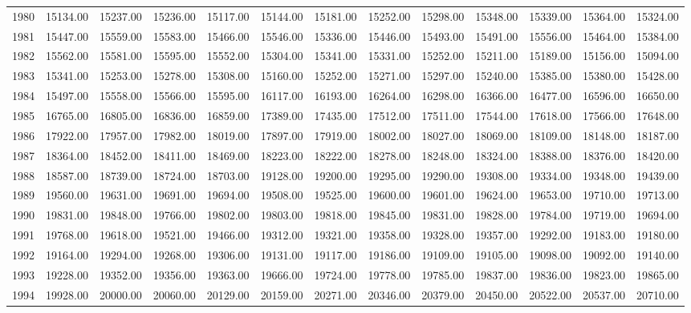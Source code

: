 \begin{longtable}{rrrrrrrrrrrrr}
  1980 & 15134.00 & 15237.00 & 15236.00 & 15117.00 & 15144.00 & 15181.00 & 15252.00 & 15298.00 & 15348.00 & 15339.00 & 15364.00 & 15324.00 \\ 
  1981 & 15447.00 & 15559.00 & 15583.00 & 15466.00 & 15546.00 & 15336.00 & 15446.00 & 15493.00 & 15491.00 & 15556.00 & 15464.00 & 15384.00 \\ 
  1982 & 15562.00 & 15581.00 & 15595.00 & 15552.00 & 15304.00 & 15341.00 & 15331.00 & 15252.00 & 15211.00 & 15189.00 & 15156.00 & 15094.00 \\ 
  1983 & 15341.00 & 15253.00 & 15278.00 & 15308.00 & 15160.00 & 15252.00 & 15271.00 & 15297.00 & 15240.00 & 15385.00 & 15380.00 & 15428.00 \\ 
  1984 & 15497.00 & 15558.00 & 15566.00 & 15595.00 & 16117.00 & 16193.00 & 16264.00 & 16298.00 & 16366.00 & 16477.00 & 16596.00 & 16650.00 \\ 
  1985 & 16765.00 & 16805.00 & 16836.00 & 16859.00 & 17389.00 & 17435.00 & 17512.00 & 17511.00 & 17544.00 & 17618.00 & 17566.00 & 17648.00 \\ 
  1986 & 17922.00 & 17957.00 & 17982.00 & 18019.00 & 17897.00 & 17919.00 & 18002.00 & 18027.00 & 18069.00 & 18109.00 & 18148.00 & 18187.00 \\ 
  1987 & 18364.00 & 18452.00 & 18411.00 & 18469.00 & 18223.00 & 18222.00 & 18278.00 & 18248.00 & 18324.00 & 18388.00 & 18376.00 & 18420.00 \\ 
  1988 & 18587.00 & 18739.00 & 18724.00 & 18703.00 & 19128.00 & 19200.00 & 19295.00 & 19290.00 & 19308.00 & 19334.00 & 19348.00 & 19439.00 \\ 
  1989 & 19560.00 & 19631.00 & 19691.00 & 19694.00 & 19508.00 & 19525.00 & 19600.00 & 19601.00 & 19624.00 & 19653.00 & 19710.00 & 19713.00 \\ 
  1990 & 19831.00 & 19848.00 & 19766.00 & 19802.00 & 19803.00 & 19818.00 & 19845.00 & 19831.00 & 19828.00 & 19784.00 & 19719.00 & 19694.00 \\ 
  1991 & 19768.00 & 19618.00 & 19521.00 & 19466.00 & 19312.00 & 19321.00 & 19358.00 & 19328.00 & 19357.00 & 19292.00 & 19183.00 & 19180.00 \\ 
  1992 & 19164.00 & 19294.00 & 19268.00 & 19306.00 & 19131.00 & 19117.00 & 19186.00 & 19109.00 & 19105.00 & 19098.00 & 19092.00 & 19140.00 \\ 
  1993 & 19228.00 & 19352.00 & 19356.00 & 19363.00 & 19666.00 & 19724.00 & 19778.00 & 19785.00 & 19837.00 & 19836.00 & 19823.00 & 19865.00 \\ 
  1994 & 19928.00 & 20000.00 & 20060.00 & 20129.00 & 20159.00 & 20271.00 & 20346.00 & 20379.00 & 20450.00 & 20522.00 & 20537.00 & 20710.00 \\ 

\end{longtable}
